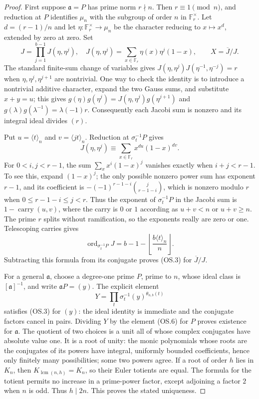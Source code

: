 \begin{proof}
First suppose $\mathfrak a=P$ has prime norm $r\nmid n$.
Then $r\equiv1\pmod n$, and reduction at $P$ identifies
$\mu_n$ with the subgroup of order $n$ in $\mathbb F_r^\times$.
Let $d=(r-1)/n$ and let $\eta:\mathbb F_r^\times\to\mu_n$ be
the character reducing to $x\mapsto x^d$, extended by zero at zero.
Set
\[
 J=\prod_{j=1}^{b-1}J(\eta,\eta^j),\quad
 J(\eta,\eta^j)=\sum_{x\in\mathbb F_r}\eta(x)\eta^j(1-x),
 \qquad X=\overline J/J.
 \tag{OS.6}
\]
The standard finite-sum change of variables gives
$J(\eta,\eta^j)J(\eta^{-1},\eta^{-j})=r$ when
$\eta,\eta^j,\eta^{j+1}$ are nontrivial.  One way to check the
identity is to introduce a nontrivial additive character, expand the
two Gauss sums, and substitute $x+y=u$; this gives
$g(\eta)g(\eta^j)=J(\eta,\eta^j)g(\eta^{j+1})$ and
$g(\lambda)g(\lambda^{-1})=\lambda(-1)r$.
Consequently each Jacobi sum is nonzero and its integral ideal divides
$(r)$.

Put $u=\langle t\rangle_n$ and $v=\langle jt\rangle_n$.
Reduction at $\sigma_t^{-1}P$ gives
\[
 J(\eta,\eta^j)\equiv
       \sum_{x\in\mathbb F_r}x^{du}(1-x)^{dv}.
\]
For $0<i,j<r-1$, the sum $\sum_x x^i(1-x)^j$ vanishes exactly
when $i+j<r-1$.  To see this, expand $(1-x)^j$; the only possible
nonzero power sum has exponent $r-1$, and its coefficient is
$-(-1)^{r-1-i}\binom{j}{r-1-i}$, which is nonzero modulo $r$ when
$0\le r-1-i\le j<r$.  Thus the exponent of
$\sigma_t^{-1}P$ in the Jacobi sum is
$1-\operatorname{carry}(u,v)$, where the carry is $0$ or $1$
according as $u+v<n$ or $u+v\ge n$.
The prime $r$ splits without ramification, so the exponents really are
zero or one.  Telescoping carries gives
\[
 \operatorname{ord}_{\sigma_t^{-1}P}J
    =b-1-\left\lfloor\frac{b\langle t\rangle_n}{n}\right\rfloor.
\]
Subtracting this formula from its conjugate proves (OS.3) for
$\overline J/J$.

For a general $\mathfrak a$, choose a degree-one prime $P$, prime to
$n$, whose ideal class is $[\mathfrak a]^{-1}$, and write
$\mathfrak aP=(y)$.  The explicit element
\[
                 Y=\prod_t\sigma_t^{-1}(y)^{\theta_{n,b}(t)}
 \tag{OS.7}
\]
satisfies (OS.3) for $(y)$: the ideal identity is immediate and the
conjugate factors cancel in pairs.  Dividing $Y$ by the element (OS.6)
for $P$ proves existence for $\mathfrak a$.
The quotient of two choices is a unit all of whose complex conjugates
have absolute value one.  It is a root of unity: the monic polynomials
whose roots are the conjugates of its powers have integral, uniformly
bounded coefficients, hence only finitely many possibilities; some two
powers agree.  If a root of order $h$ lies in $K_n$, then
$K_{\operatorname{lcm}(n,h)}=K_n$, so their Euler totients are equal.
The formula for the totient permits no increase in a prime-power
factor, except adjoining a factor $2$ when $n$ is odd.  Thus
$h\mid2n$.  This proves
the stated uniqueness.


\end{proof}
